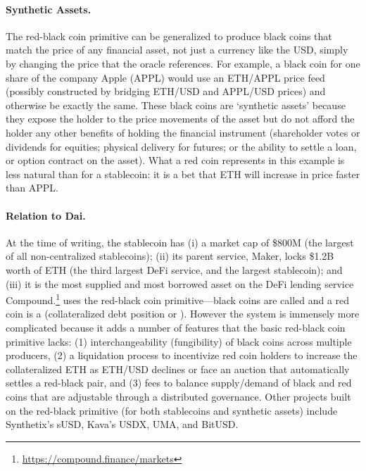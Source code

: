 \paragraph{Synthetic Assets.} The red-black coin primitive can be generalized to produce black coins that match the price of any financial asset, not just a currency like the USD, simply by changing the price that the oracle references. For example, a black coin for one share of the company Apple (APPL) would use an ETH/APPL price feed (possibly constructed by bridging ETH/USD and APPL/USD prices) and otherwise be exactly the same. These black coins are `synthetic assets' because they expose the holder to the price movements of the asset but do not afford the holder any other benefits of holding the financial instrument (\eg shareholder votes or dividends for equities; physical delivery for futures; or the ability to settle a loan, or option contract on the asset). What a red coin represents in this example is less natural than for a stablecoin: it is a bet that ETH will increase in price faster than APPL.

\paragraph{Relation to Dai.} At the time of writing, the stablecoin \dai has (i) a market cap of \$800M (the largest of all non-centralized stablecoins); (ii) its parent service, Maker, locks \$1.2B worth of ETH (the third largest DeFi service, and the largest stablecoin); and (iii) it is the most supplied and most borrowed asset on the DeFi lending service Compound.\footnote{\url{https://compound.finance/markets}} \dai uses the red-black coin primitive---black coins are called \dai and a red coin is a \vault (\nee collateralized debt position or \cdp). However the system is immensely more complicated because it adds a number of features that the basic red-black coin primitive lacks: (1) interchangeability (fungibility) of black coins across multiple producers, (2) a liquidation process to incentivize red coin holders to increase the collateralized ETH as ETH/USD declines or face an auction that automatically settles a red-black pair, and (3) fees to balance supply/demand of black and red coins that are adjustable through a distributed governance. Other projects built on the red-black primitive (for both stablecoins and synthetic assets) include Synthetix's sUSD, Kava's USDX, UMA, and BitUSD. 

